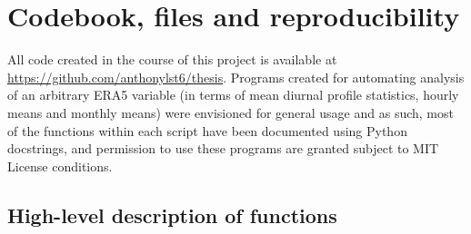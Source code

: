 \chapter{Codebook, files and reproducibility}
\label{app:code}

All code created in the course of this project is available at \url{https://github.com/anthonylst6/thesis}. Programs created for automating analysis of an arbitrary ERA5 variable (in terms of mean diurnal profile statistics, hourly means and monthly means) were envisioned for general usage and as such, most of the functions within each script have been documented using Python docstrings, and permission to use these programs are granted subject to MIT License conditions.

\section{High-level description of functions}

